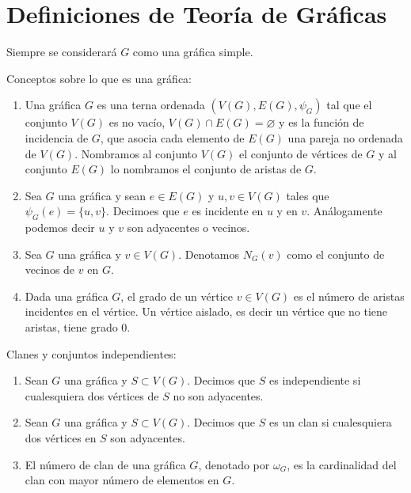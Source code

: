 \chapter{Definiciones de Teor\'ia de Gr\'aficas}%
\label{cap:defs grafs}


Siempre se considerar\'a $G$ como una gr\'afica simple.

\begin{definicion} Conceptos sobre lo que es una gr\'afica:
    \label{def:grafica}
    \begin{enumerate}
        \item Una gr\'afica $G$ es una terna ordenada $(V(G), E(G),
        \psi_G)$ tal que el conjunto $V(G)$ es no vac\'i{}o, $V(G) \cap
        E(G) = \varnothing$ y es la funci\'on de incidencia de $G$, que
        asocia cada elemento de $E(G)$ una pareja no ordenada de $V(G)$.
        Nombramos al conjunto $V(G)$ el conjunto de v\'ertices de $G$ y al
        conjunto $E(G)$ lo nombramos el conjunto de aristas de $G$.
        \item Sea $G$ una gr\'afica y sean $e \in E(G)$ y $u,v \in V(G)$
        tales que $\psi_G(e)= \{u, v\}$. Decimoes que $e$ es incidente en
        $u$ y en $v$. An\'alogamente podemos decir $u$ y $v$ son adyacentes
        o vecinos.
        \item Sea $G$ una gr\'afica y $v\in V(G)$. Denotamos $N_G(v)$ como
        el conjunto de vecinos de $v$ en $G$.
        \item Dada una gr\'afica $G$, el grado de un v\'ertice $v \in V(G)$
        es el n\'umero de aristas incidentes en el v\'ertice. Un v\'ertice
        aislado, es decir un v\'ertice que no tiene aristas, tiene grado 0.
    \end{enumerate}
\end{definicion}

\begin{definicion} Clanes y conjuntos independientes:
    \label{def:clanes y conjunto independiente}
    \begin{enumerate}
        \item Sean $G$ una gr\'afica y $S \subset V(G)$. Decimos que $S$ es
        independiente si cualesquiera dos v\'ertices de $S$ no son adyacentes.
        \item Sean $G$ una gr\'afica y $S \subset V(G)$. Decimos que $S$ es un
        clan si cualesquiera dos v\'ertices en $S$ son adyacentes.
        \item El n\'umero de clan de una gr\'afica $G$, denotado por $\omega_G$,
        es la cardinalidad del clan con mayor n\'umero de elementos en $G$.
    \end{enumerate}
\end{definicion}

